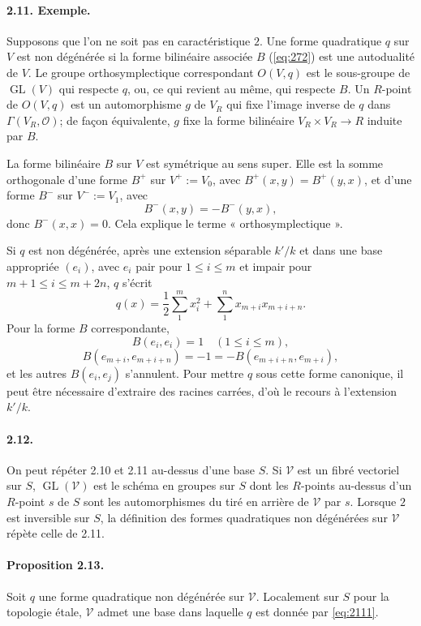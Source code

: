 \documentclass[11pt]{article}
\newcommand{\GL}{\operatorname{GL}}
\newcommand{\calO}{\mathcal O}
\begin{document}
\paragraph{2.11. Exemple.}
Supposons que l'on ne soit pas en caractéristique $2$. Une forme quadratique $q$ sur $V$ est non dégénérée si la forme bilinéaire associée $B$ (\eqref{eq:272}) est une autodualité de $V$. Le groupe orthosymplectique correspondant $O(V,q)$ est le sous-groupe de $\GL(V)$ qui respecte $q$, ou, ce qui revient au même, qui respecte $B$. Un $R$-point de $O(V,q)$ est un automorphisme $g$ de $V_R$ qui fixe l'image inverse de $q$ dans $\Gamma(V_R,\calO)$; de façon équivalente, $g$ fixe la forme bilinéaire $V_R\times V_R\to R$ induite par $B$.

La forme bilinéaire $B$ sur $V$ est symétrique au sens super. Elle est la somme orthogonale d'une forme $B^+$ sur $V^+:=V_0$, avec $B^+(x,y)=B^+(y,x)$, et d'une forme $B^-$ sur $V^-:=V_1$, avec
\[
B^-(x,y)=-B^-(y,x),
\]
donc $B^-(x,x)=0$. Cela explique le terme « orthosymplectique ».

Si $q$ est non dégénérée, après une extension séparable $k'/k$ et dans une base appropriée $(e_i)$, avec $e_i$ pair pour $1\leq i\leq m$ et impair pour $m+1\leq i\leq m+2n$, $q$ s'écrit
\begin{equation}
\label{eq:2111}
q(x)=\frac12\sum_{1}^{m}x_i^2+\sum_{1}^{n}x_{m+i}x_{m+i+n}.
\end{equation}
Pour la forme $B$ correspondante,
\begin{equation}
\label{eq:2112}
B(e_i,e_i)=1\quad (1\leq i\leq m),
\end{equation}
\[
B(e_{m+i},e_{m+i+n})=-1=-B(e_{m+i+n},e_{m+i}),
\]
et les autres $B(e_i,e_j)$ s'annulent. Pour mettre $q$ sous cette forme canonique, il peut être nécessaire d'extraire des racines carrées, d'où le recours à l'extension $k'/k$.

\paragraph{2.12.}
On peut répéter 2.10 et 2.11 au-dessus d'une base $S$. Si $\mathcal V$ est un fibré vectoriel sur $S$, $\GL(\mathcal V)$ est le schéma en groupes sur $S$ dont les $R$-points au-dessus d'un $R$-point $s$ de $S$ sont les automorphismes du tiré en arrière de $\mathcal V$ par $s$. Lorsque $2$ est inversible sur $S$, la définition des formes quadratiques non dégénérées sur $\mathcal V$ répète celle de 2.11.

\paragraph{Proposition 2.13.}
Soit $q$ une forme quadratique non dégénérée sur $\mathcal V$. Localement sur $S$ pour la topologie étale, $\mathcal V$ admet une base dans laquelle $q$ est donnée par \eqref{eq:2111}.
\end{document}
